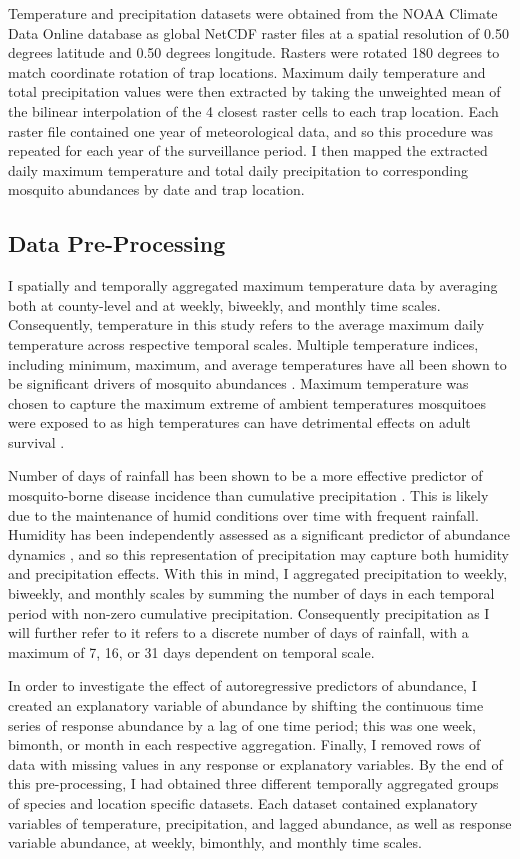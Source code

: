 Temperature and precipitation datasets were obtained from the NOAA Climate Data Online database as global NetCDF raster files at a spatial resolution of 0.50 degrees latitude and 0.50 degrees longitude. Rasters were rotated 180 degrees to match coordinate rotation of trap locations. Maximum daily temperature and total precipitation values were then extracted by taking the unweighted mean of the bilinear interpolation of the 4 closest raster cells to each trap location. Each raster file contained one year of meteorological data, and so this procedure was repeated for each year of the surveillance period. I then mapped the extracted daily maximum temperature and total daily precipitation to corresponding mosquito abundances by date and trap location. 


\subsection{Data Pre-Processing}

I spatially and temporally aggregated maximum temperature data by averaging both at county-level and at weekly, biweekly, and monthly time scales. Consequently, temperature in this study refers to the average maximum daily temperature across respective temporal scales. Multiple temperature indices, including minimum, maximum, and average temperatures have all been shown to be significant drivers of mosquito abundances \citep{Chaves2013, Roiz2014, Xu2017}. Maximum temperature was chosen to capture the maximum extreme of ambient temperatures mosquitoes were exposed to as high temperatures can have detrimental effects on adult survival  \citep{Marini2016}.

Number of days of rainfall has been shown to be a more effective predictor of mosquito-borne disease incidence than cumulative precipitation \citep{Xu2017}. This is likely due to the maintenance of humid conditions over time with frequent rainfall. Humidity has been independently assessed as a significant predictor of abundance dynamics \citep{Trawinski2008}, and so this representation of precipitation may capture both humidity and precipitation effects. With this in mind, I aggregated precipitation to weekly, biweekly, and monthly scales by summing the number of days in each temporal period with non-zero cumulative precipitation. Consequently precipitation as I will further refer to it refers to a discrete number of days of rainfall, with a maximum of 7, 16, or 31 days dependent on temporal scale. 

In order to investigate the effect of autoregressive predictors of abundance, I created an explanatory variable of abundance by shifting the continuous time series of response abundance by a lag of one time period; this was one week, bimonth, or month in each respective aggregation. Finally, I removed rows of data with missing values in any response or explanatory variables. By the end of this pre-processing, I had obtained three different temporally aggregated groups of species and location specific datasets. Each dataset contained explanatory variables of temperature, precipitation, and lagged abundance, as well as response variable abundance, at weekly, bimonthly, and monthly time scales.


